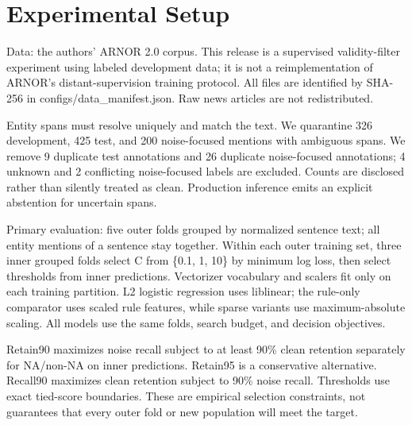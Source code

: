 \documentclass[11pt]{article}
\begin{document}
\section{Experimental Setup}

Data: the authors' ARNOR 2.0 corpus. This release is a supervised validity-filter experiment using labeled development data; it is not a reimplementation of ARNOR's distant-supervision training protocol. All files are identified by SHA-256 in configs/data\_manifest.json. Raw news articles are not redistributed.

\begin{table}[t]\centering\small
{}
\caption{Corpus audit and evaluation populations.}
\end{table}

Entity spans must resolve uniquely and match the text. We quarantine 326 development, 425 test, and 200 noise-focused mentions with ambiguous spans. We remove 9 duplicate test annotations and 26 duplicate noise-focused annotations; 4 unknown and 2 conflicting noise-focused labels are excluded. Counts are disclosed rather than silently treated as clean. Production inference emits an explicit abstention for uncertain spans.

Primary evaluation: five outer folds grouped by normalized sentence text; all entity mentions of a sentence stay together. Within each outer training set, three inner grouped folds select C from \{0.1, 1, 10\} by minimum log loss, then select thresholds from inner predictions. Vectorizer vocabulary and scalers fit only on each training partition. L2 logistic regression uses liblinear; the rule-only comparator uses scaled rule features, while sparse variants use maximum-absolute scaling. All models use the same folds, search budget, and decision objectives.

Retain90 maximizes noise recall subject to at least 90\% clean retention separately for NA/non-NA on inner predictions. Retain95 is a conservative alternative. Recall90 maximizes clean retention subject to 90\% noise recall. Thresholds use exact tied-score boundaries. These are empirical selection constraints, not guarantees that every outer fold or new population will meet the target.
\end{document}
